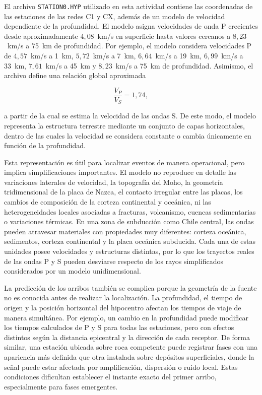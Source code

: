 \documentclass[a4paper,12pt]{article} %
\numberwithin{equation}{section} %
\numberwithin{figure}{section} %
\begin{document}
El archivo \texttt{STATION0.HYP} utilizado en esta actividad contiene las coordenadas de las estaciones de las redes C1 y CX, además de un modelo de velocidad dependiente de la profundidad. El modelo asigna velocidades de onda P crecientes desde aproximadamente $4{,}08$~km/s en superficie hasta valores cercanos a $8{,}23$~km/s a 75~km de profundidad. Por ejemplo, el modelo considera velocidades P de $4{,}57$~km/s a 1~km, $5{,}72$~km/s a 7~km, $6{,}64$~km/s a 19~km, $6{,}99$~km/s a 33~km, $7{,}61$~km/s a 45~km y $8{,}23$~km/s a 75~km de profundidad. Asimismo, el archivo define una relación global aproximada

\[
\frac{V_P}{V_S}=1{,}74,
\]

a partir de la cual se estima la velocidad de las ondas S. De este modo, el modelo representa la estructura terrestre mediante un conjunto de capas horizontales, dentro de las cuales la velocidad se considera constante o cambia únicamente en función de la profundidad.

Esta representación es útil para localizar eventos de manera operacional, pero implica simplificaciones importantes. El modelo no reproduce en detalle las variaciones laterales de velocidad, la topografía del Moho, la geometría tridimensional de la placa de Nazca, el contacto irregular entre las placas, los cambios de composición de la corteza continental y oceánica, ni las heterogeneidades locales asociadas a fracturas, volcanismo, cuencas sedimentarias o variaciones térmicas. En una zona de subducción como Chile central, las ondas pueden atravesar materiales con propiedades muy diferentes: corteza oceánica, sedimentos, corteza continental y la placa oceánica subducida. Cada una de estas unidades posee velocidades y estructuras distintas, por lo que los trayectos reales de las ondas P y S pueden desviarse respecto de los rayos simplificados considerados por un modelo unidimensional.

La predicción de los arribos también se complica porque la geometría de la fuente no es conocida antes de realizar la localización. La profundidad, el tiempo de origen y la posición horizontal del hipocentro afectan los tiempos de viaje de manera simultánea. Por ejemplo, un cambio en la profundidad puede modificar los tiempos calculados de P y S para todas las estaciones, pero con efectos distintos según la distancia epicentral y la dirección de cada receptor. De forma similar, una estación ubicada sobre roca competente puede registrar fases con una apariencia más definida que otra instalada sobre depósitos superficiales, donde la señal puede estar afectada por amplificación, dispersión o ruido local. Estas condiciones dificultan establecer el instante exacto del primer arribo, especialmente para fases emergentes.
\end{document}
